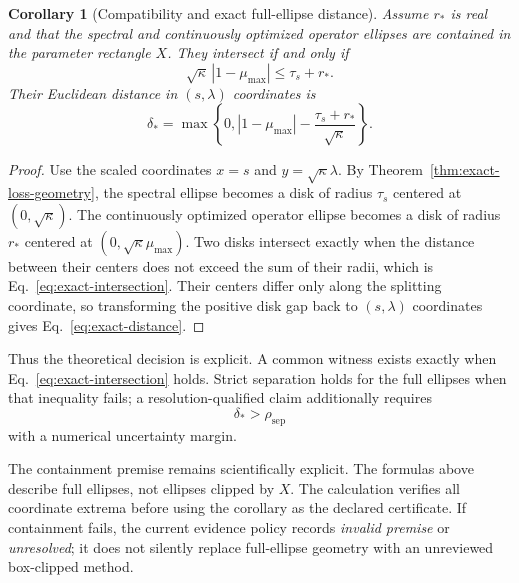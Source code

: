 \documentclass[11pt]{article}
\newtheorem{corollary}[theorem]{Corollary}
\begin{document}
\begin{corollary}[Compatibility and exact full-ellipse distance]
\label{cor:compatibility-distance}
Assume $r_*$ is real and that the spectral and continuously optimized operator ellipses
are contained in the parameter rectangle $X$. They intersect if and only if
\begin{equation}
 \sqrt{\kappa}\,|1-\mu_{\max}|
 \le \tau_s+r_*.
 \label{eq:exact-intersection}
\end{equation}
Their Euclidean distance in $(s,\lambda)$ coordinates is
\begin{equation}
 \delta_*=
 \max\left\{0,
 |1-\mu_{\max}|-\frac{\tau_s+r_*}{\sqrt{\kappa}}
 \right\}.
 \label{eq:exact-distance}
\end{equation}
\end{corollary}

\begin{proof}
Use the scaled coordinates $x=s$ and $y=\sqrt{\kappa}\lambda$. By
Theorem~\ref{thm:exact-loss-geometry}, the spectral ellipse becomes a disk of radius
$\tau_s$ centered at $(0,\sqrt{\kappa})$. The continuously optimized operator ellipse
becomes a disk of radius $r_*$ centered at
$(0,\sqrt{\kappa}\mu_{\max})$. Two disks intersect exactly when the distance between
their centers does not exceed the sum of their radii, which is
Eq.~\eqref{eq:exact-intersection}. Their centers differ only along the splitting
coordinate, so transforming the positive disk gap back to $(s,\lambda)$ coordinates
gives Eq.~\eqref{eq:exact-distance}.
\end{proof}

Thus the theoretical decision is explicit. A common witness exists exactly when
Eq.~\eqref{eq:exact-intersection} holds. Strict separation holds for the full ellipses
when that inequality fails; a resolution-qualified claim additionally requires
\begin{equation}
 \delta_*>\rho_{\mathrm{sep}}
 \label{eq:resolution-qualified-separation}
\end{equation}
with a numerical uncertainty margin.

The containment premise remains scientifically explicit. The formulas above describe
full ellipses, not ellipses clipped by $X$. The calculation verifies all coordinate
extrema before using the corollary as the declared certificate. If containment fails,
the current evidence policy records \emph{invalid premise} or \emph{unresolved}; it does
not silently replace full-ellipse geometry with an unreviewed box-clipped method.
\end{document}
